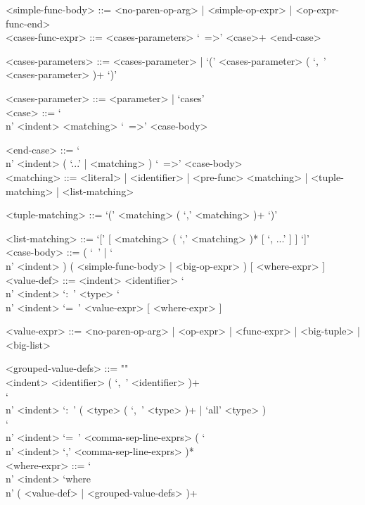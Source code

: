 \documentclass{article}
\begin{document}
\begin{grammar}
<simple-func-body> ::= <no-paren-op-arg> | <simple-op-expr> | <op-expr-func-end> \\

<cases-func-expr> ::= <cases-parameters> `\ =>' <case>+ <end-case> 

<cases-parameters> ::=
<cases-parameter> | `(' <cases-parameter> ( `,\ ' <cases-parameter> )+ `)'

<cases-parameter> ::= <parameter> | `cases' \\

<case> ::=  `\\n' <indent> <matching> `\ =>' <case-body>

<end-case> ::=
`\\n' <indent> ( `...' | <matching> ) `\ =>' <case-body>\\

<matching> ::= 
<literal> | <identifier> | <pre-func> <matching> | <tuple-matching> |
<list-matching>

<tuple-matching> ::= `(' <matching> ( `,' <matching> )+ `)'

<list-matching> ::= `[' [ <matching> ( `,' <matching> )* [ `, ...' ] ] `]' \\

<case-body> ::=
( `\ ' | `\\n' <indent> ) ( <simple-func-body> | <big-op-expr> ) [ <where-expr> ]\\

<value-def> ::= 
<indent> <identifier> 
`\\n' <indent> `:\ ' <type> 
`\\n' <indent> `=\ ' <value-expr> [ <where-expr> ]

<value-expr> ::=
<no-paren-op-arg> | <op-expr> | <func-expr> | <big-tuple> | <big-list>

<grouped-value-defs> ::= ""\\
<indent> <identifier> ( `,\ ' <identifier> )+ \\
`\\n' <indent> `:\ ' ( <type> ( `,\ ' <type> )+ | `all' <type> ) \\
`\\n' <indent> `=\ '
<comma-sep-line-exprs> ( `\\n' <indent> `,' <comma-sep-line-exprs> )* \\

<where-expr> ::=
`\\n' <indent> `where\\n' ( <value-def> | <grouped-value-defs> )+ \\
\end{grammar}
\end{document}
